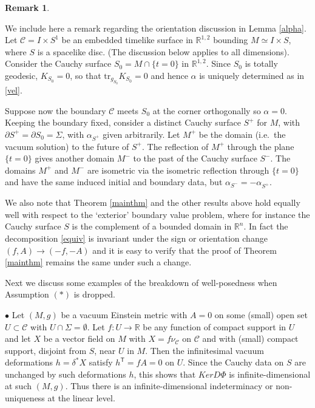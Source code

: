 \documentclass[10pt]{amsart}
\renewcommand{\a}{\alpha}
\renewcommand{\d}{\delta}
\newcommand{\Si}{\Sigma}
\newcommand{\cC}{{\mathcal C}}
\newcommand{\bR}{\mathbb R}
\newcommand{\tT}{\mathsf{T}}
\newcommand{\tr}{\mathrm{tr}}
\newcommand{\p}{\partial}
\renewcommand{\to}{\rightarrow}
\newcommand{\<}{\langle}
\renewcommand{\>}{\rangle}
\theoremstyle{plain}
\theoremstyle{remark}
\theoremstyle{definition}
\newtheorem{remark}[lemma]{Remark}
\numberwithin{equation}{section}
\begin{document}
\begin{remark} \label{flip}
{\rm We include here a remark regarding the orientation discussion in Lemma \ref{alpha}. Let $\cC = I\times S^1$ be an embedded timelike surface in $\bR^{1,2}$ 
bounding $M \simeq I\times S$, where $S$ is a spacelike disc. (The discussion below applies to all dimensions). Consider the Cauchy surface $S_0 = M\cap \{t = 0\}$ in 
$\bR^{1,2}$. Since $S_0$ is totally geodesic, $K_{S_0} = 0$, so that $\tr_{g_{S_0}} K_{S_0} = 0$ and hence $\a$ is uniquely determined as in \eqref{vel}. 

  Suppose now the boundary $\cC$ meets $S_0$ at the corner orthogonally so $\a = 0$. Keeping the boundary fixed, consider a distinct Cauchy surface $S^+$ for $M$, 
with $\p S^+ = \p S_0 = \Si$, with $\a_{S^+}$ given arbitrarily. Let $M^+$ be the domain (i.e.~the vacuum solution) to the future of $S^+$. The reflection of $M^+$ 
through the plane $\{t = 0\}$ gives another domain $M^-$ to the past of the Cauchy surface $S^-$. The domains $M^+$ and $M^-$ are isometric via the isometric 
reflection through $\{t = 0\}$ and have the same induced initial and boundary data, but $\a_{S^-} = -\a_{S^+}$.  

  We also note that Theorem \ref{mainthm} and the other results above hold equally well with respect to the `exterior' boundary value problem, where for instance 
the Cauchy surface $S$ is the complement of a bounded domain in $\bR^n$. In fact the decomposition \eqref{equiv} is invariant under the sign or orientation 
change $(f, A) \to (-f, -A)$ and it is easy to verify that the proof of Theorem \ref{mainthm} remains the same under such a change. 

}
\end{remark}


  Next we discuss some examples of the breakdown of well-posedness when Assumption $(*)$ is dropped. 
  
   \smallskip 

$\bullet$ Let $(M, g)$ be a vacuum Einstein metric with $A = 0$ on some (small) open set $U \subset \cC$ with $U \cap \Si = \emptyset$. Let $f: U \to \bR$ be 
any function of compact support in $U$ and let $X$ be a vector field on $M$ with $X = f\nu_{\cC}$ on $\cC$ and with (small) compact support, disjoint from $S$, 
near $U$ in $M$. Then the infinitesimal vacuum deformations $h = \d^*X$ satisfy $h^{\tT} = fA = 0$ on $U$. Since the Cauchy data on $S$ are unchanged by such 
deformations $h$, this shows that $Ker D\Phi$ is infinite-dimensional at such $(M, g)$. Thus there is an infinite-dimensional indeterminacy or non-uniqueness at 
the linear level. 
\end{document}
